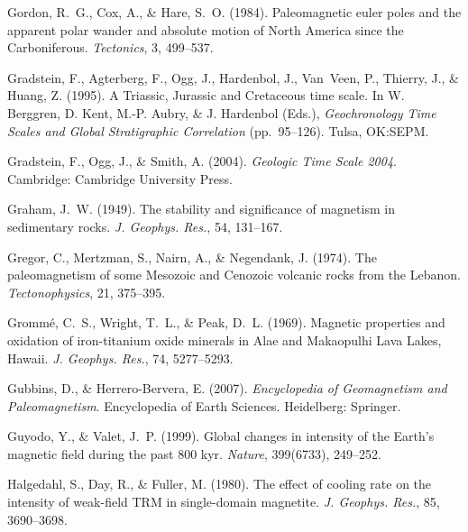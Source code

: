 \documentclass[,plain]{tauxe}
\begin{document}
\begin{thebibliography}{}
\bibitem{}%
Gordon, R.~G., Cox, A., \& Hare, S.~O. (1984).
Paleomagnetic euler poles and the apparent polar wander and absolute motion of North America since the Carboniferous.
{\it Tectonics}, 3, 499--537.

\bibitem{}%
Gradstein, F., Agterberg, F., Ogg, J., Hardenbol, J., Van~Veen, P., Thierry, J., \& Huang, Z. (1995).
A Triassic, Jurassic and Cretaceous time scale.
In W. Berggren, D. Kent, M.-P. Aubry, \& J. Hardenbol (Eds.), {\it Geochronology Time Scales and Global Stratigraphic Correlation} (pp.\ 95--126). Tulsa, OK:\break SEPM.

\bibitem{}%
Gradstein, F., Ogg, J., \& Smith, A. (2004).
{\it Geologic Time Scale 2004}.
Cambridge: Cambridge University Press.

\bibitem{}%
Graham, J.~W. (1949).
The stability and significance of magnetism in sedimentary rocks.
{\it J. Geophys. Res.}, 54, 131--167.

\bibitem{}%
Gregor, C., Mertzman, S., Nairn, A., \& Negendank, J. (1974).
The paleomagnetism of some Mesozoic and Cenozoic volcanic rocks from the Lebanon.
{\it Tectonophysics}, 21, 375--395.

\bibitem{}%
Gromm\'e, C.~S., Wright, T.~L., \& Peak, D.~L. (1969).
Magnetic properties and oxidation of iron-titanium oxide minerals in Alae and Makaopulhi Lava Lakes, Hawaii.
{\it J. Geophys. Res.}, 74, 5277--5293.

\bibitem{}%
Gubbins, D., \& Herrero-Bervera, E. (2007).
{\it Encyclopedia of Geomagnetism and Paleomagnetism}.
Encyclopedia of Earth Sciences. Heidelberg:  Springer.

\bibitem{}%
Guyodo, Y., \& Valet, J.~P. (1999).
Global changes in intensity of the Earth's magnetic field during the past 800 kyr.
{\it Nature}, 399(6733), 249--252.

\bibitem{}
Halgedahl, S., Day, R., \& Fuller, M. (1980). The effect of cooling
rate on the intensity of weak-field TRM in single-domain magnetite.
{\it J. Geophys. Res.}, 85, 3690--3698.




\end{thebibliography}
\end{document}
